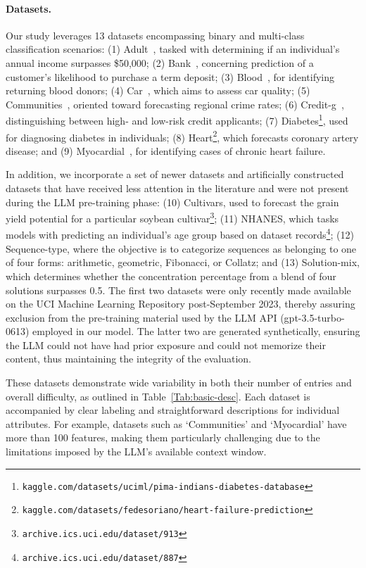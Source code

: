\paragraph{Datasets.}
Our study leverages 13 datasets encompassing binary and multi-class classification scenarios: (1) Adult~\cite{asuncion2007uci}, tasked with determining if an individual’s annual income surpasses \$50,000; (2) Bank~\cite{moro2014data}, concerning prediction of a customer’s likelihood to purchase a term deposit; (3) Blood~\cite{yeh2009knowledge}, for identifying returning blood donors; (4) Car~\cite{kadra2021well}, which aims to assess car quality; (5) Communities~\cite{misc_communities_and_crime_183}, oriented toward forecasting regional crime rates; (6) Credit-g~\cite{kadra2021well}, distinguishing between high- and low-risk credit applicants; (7) Diabetes\footnote{\texttt{kaggle.com/datasets/uciml/pima-indians-diabetes-database}}, used for diagnosing diabetes in individuals; (8) Heart\footnote{\texttt{kaggle.com/datasets/fedesoriano/heart-failure-prediction}}, which forecasts coronary artery disease; and (9) Myocardial~\cite{misc_myocardial_infarction_complications_579}, for identifying cases of chronic heart failure.

In addition, we incorporate a set of newer datasets and artificially constructed datasets that have received less attention in the literature and were not present during the LLM pre-training phase: (10) Cultivars, used to forecast the grain yield potential for a particular soybean cultivar\footnote{\texttt{archive.ics.uci.edu/dataset/913}}; (11) NHANES, which tasks models with predicting an individual’s age group based on dataset records\footnote{\texttt{archive.ics.uci.edu/dataset/887}}; (12) Sequence-type, where the objective is to categorize sequences as belonging to one of four forms: arithmetic, geometric, Fibonacci, or Collatz; and (13) Solution-mix, which determines whether the concentration percentage from a blend of four solutions surpasses 0.5. The first two datasets were only recently made available on the UCI Machine Learning Repository post-September 2023, thereby assuring exclusion from the pre-training material used by the LLM API (gpt-3.5-turbo-0613) employed in our model. The latter two are generated synthetically, ensuring the LLM could not have had prior exposure and could not memorize their content, thus maintaining the integrity of the evaluation.

These datasets demonstrate wide variability in both their number of entries and overall difficulty, as outlined in Table~\ref{Tab:basic-desc}. Each dataset is accompanied by clear labeling and straightforward descriptions for individual attributes. For example, datasets such as `Communities' and `Myocardial' have more than 100 features, making them particularly challenging due to the limitations imposed by the LLM's available context window.

